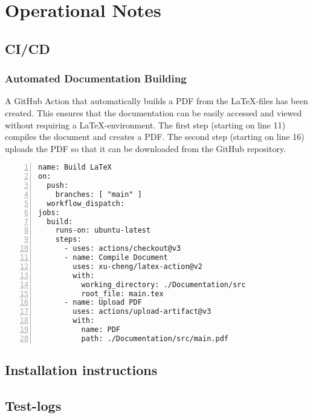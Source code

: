 \chapter{Operational Notes}



\section{CI/CD}

\subsection{Automated Documentation Building}

A GitHub Action that automatically builds a PDF from the \LaTeX-files has been created.
This ensures that the documentation can be easily accessed and viewed without requiring a \LaTeX-environment.
The first step (starting on line 11) compiles the document and creates a PDF.
The second step (starting on line 16) uploads the PDF so that it can be downloaded from the GitHub repository.

\begin{Verbatim}[samepage=true,numbers=left,xleftmargin=7.5mm]
name: Build LaTeX
on:
  push:
    branches: [ "main" ]
  workflow_dispatch:
jobs:
  build:
    runs-on: ubuntu-latest
    steps:
      - uses: actions/checkout@v3
      - name: Compile Document
        uses: xu-cheng/latex-action@v2
        with:
          working_directory: ./Documentation/src
          root_file: main.tex
      - name: Upload PDF
        uses: actions/upload-artifact@v3
        with:
          name: PDF
          path: ./Documentation/src/main.pdf
\end{Verbatim}


\section{Installation instructions}

\section{Test-logs}

            